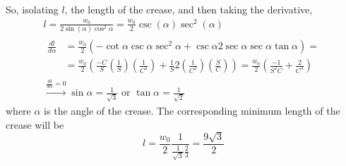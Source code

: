 \documentclass[twoside]{amsart}
\theoremstyle{plain}
\theoremstyle{definition}
\begin{document}
So, isolating $l$, the length of the crease, and then taking the derivative,
\[
\begin{gathered}
  l  = \frac{ w_0 }{ 2 \sin{(\alpha)} \cos^2{\alpha} } = \frac{ w_0}{2} \csc{ (\alpha) } \sec^2{(\alpha) } \\
\begin{aligned} 
  \frac{dl}{d\alpha} & = \frac{w_0}{2} \left( -\cot{\alpha} \csc{\alpha} \sec^2{\alpha} + \csc{\alpha} 2 \sec{\alpha} \sec{\alpha} \tan{\alpha} \right) = \\
  & = \frac{w_0}{2} \left( \frac{ -C}{S} \left( \frac{1}{S} \right) \left( \frac{1}{C^2 } \right) + \frac{1}{S} 2 \left( \frac{1}{C^2} \right) \left( \frac{S}{C} \right) \right) = \frac{w_0}{2} \left( \frac{-1}{S^2 C} + \frac{2}{C^3} \right) 
\end{aligned} \\
\xrightarrow{ \frac{dl}{d\alpha} = 0 } \boxed{ \sin{ \alpha} = \frac{1}{\sqrt{3}} } \text{ or } \tan{\alpha} = \frac{1}{\sqrt{2}} 
\end{gathered}
\]
where $\alpha$ is the angle of the crease.  The corresponding minimum length of the crease will be 
\[
l = \frac{w_0}{2} \frac{1}{ \frac{ 1}{ \sqrt{3}} \frac{2}{3} } = \boxed{ \frac{ 9 \sqrt{3}}{2 } }
\]
\end{document}
